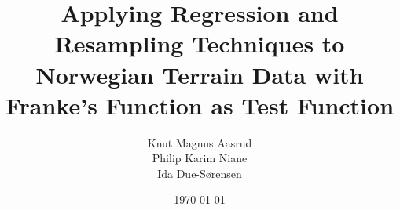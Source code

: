 \documentclass{article}
\title{Applying Regression and Resampling Techniques to Norwegian Terrain Data with Franke's Function as Test Function}
\author{Knut Magnus Aasrud \\ Philip Karim Niane \\ Ida Due-Sørensen}
\date{\today}
\begin{document}
\maketitle















\printbibliography
\clearpage
\appendix
\iffalse
Appendix should start on own page and have its own section numbering
\fi




%
\end{document}
